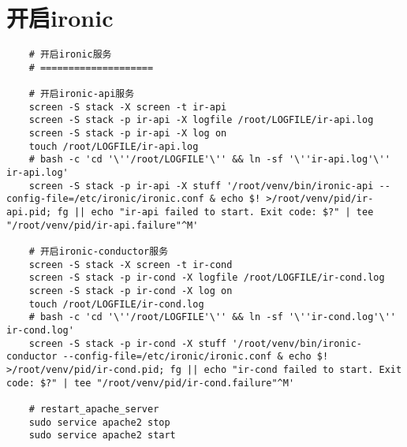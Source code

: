 \documentclass[a4paper,left=1.5cm,right=1.5cm,11pt]{article}
\begin{document}
\section{开启ironic}
	\begin{lstlisting}
	# 开启ironic服务
	# ====================

	# 开启ironic-api服务
	screen -S stack -X screen -t ir-api
	screen -S stack -p ir-api -X logfile /root/LOGFILE/ir-api.log
    screen -S stack -p ir-api -X log on
	touch /root/LOGFILE/ir-api.log
    # bash -c 'cd '\''/root/LOGFILE'\'' && ln -sf '\''ir-api.log'\'' ir-api.log'
	screen -S stack -p ir-api -X stuff '/root/venv/bin/ironic-api --config-file=/etc/ironic/ironic.conf & echo $! >/root/venv/pid/ir-api.pid; fg || echo "ir-api failed to start. Exit code: $?" | tee "/root/venv/pid/ir-api.failure"^M'

	# 开启ironic-conductor服务
	screen -S stack -X screen -t ir-cond
	screen -S stack -p ir-cond -X logfile /root/LOGFILE/ir-cond.log
    screen -S stack -p ir-cond -X log on
	touch /root/LOGFILE/ir-cond.log
    # bash -c 'cd '\''/root/LOGFILE'\'' && ln -sf '\''ir-cond.log'\'' ir-cond.log'
	screen -S stack -p ir-cond -X stuff '/root/venv/bin/ironic-conductor --config-file=/etc/ironic/ironic.conf & echo $! >/root/venv/pid/ir-cond.pid; fg || echo "ir-cond failed to start. Exit code: $?" | tee "/root/venv/pid/ir-cond.failure"^M'

	# restart_apache_server
	sudo service apache2 stop
	sudo service apache2 start
	\end{lstlisting}
\end{document}
